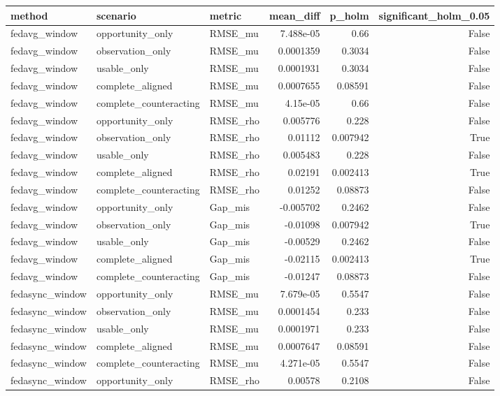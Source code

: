 \begin{tabular}{lllrrr}
\toprule
method & scenario & metric & mean_diff & p_holm & significant_holm_0.05 \\
\midrule
fedavg_window & opportunity_only & RMSE_mu & 7.488e-05 & 0.66 & False \\
fedavg_window & observation_only & RMSE_mu & 0.0001359 & 0.3034 & False \\
fedavg_window & usable_only & RMSE_mu & 0.0001931 & 0.3034 & False \\
fedavg_window & complete_aligned & RMSE_mu & 0.0007655 & 0.08591 & False \\
fedavg_window & complete_counteracting & RMSE_mu & 4.15e-05 & 0.66 & False \\
fedavg_window & opportunity_only & RMSE_rho & 0.005776 & 0.228 & False \\
fedavg_window & observation_only & RMSE_rho & 0.01112 & 0.007942 & True \\
fedavg_window & usable_only & RMSE_rho & 0.005483 & 0.228 & False \\
fedavg_window & complete_aligned & RMSE_rho & 0.02191 & 0.002413 & True \\
fedavg_window & complete_counteracting & RMSE_rho & 0.01252 & 0.08873 & False \\
fedavg_window & opportunity_only & Gap_mis & -0.005702 & 0.2462 & False \\
fedavg_window & observation_only & Gap_mis & -0.01098 & 0.007942 & True \\
fedavg_window & usable_only & Gap_mis & -0.00529 & 0.2462 & False \\
fedavg_window & complete_aligned & Gap_mis & -0.02115 & 0.002413 & True \\
fedavg_window & complete_counteracting & Gap_mis & -0.01247 & 0.08873 & False \\
fedasync_window & opportunity_only & RMSE_mu & 7.679e-05 & 0.5547 & False \\
fedasync_window & observation_only & RMSE_mu & 0.0001454 & 0.233 & False \\
fedasync_window & usable_only & RMSE_mu & 0.0001971 & 0.233 & False \\
fedasync_window & complete_aligned & RMSE_mu & 0.0007647 & 0.08591 & False \\
fedasync_window & complete_counteracting & RMSE_mu & 4.271e-05 & 0.5547 & False \\
fedasync_window & opportunity_only & RMSE_rho & 0.00578 & 0.2108 & False \\

\end{tabular}
